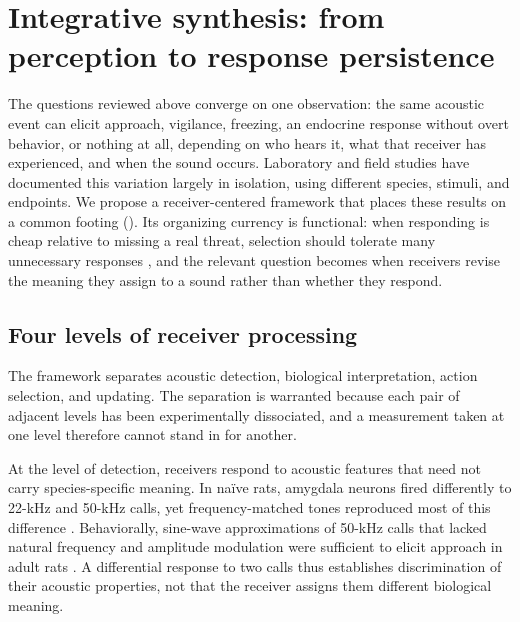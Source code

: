 \section{Integrative synthesis: from perception to response persistence}
\label{sec:synthesis}


The questions reviewed above converge on one observation: the same acoustic event can elicit approach, vigilance, freezing, an endocrine response without overt behavior, or nothing at all, depending on who hears it, what that receiver has experienced, and when the sound occurs. Laboratory and field studies have documented this variation largely in isolation, using different species, stimuli, and endpoints. We propose a receiver-centered framework that places these results on a common footing (). Its organizing currency is functional: when responding is cheap relative to missing a real threat, selection should tolerate many unnecessary responses \citep{Nesse2005}, and the relevant question becomes when receivers revise the meaning they assign to a sound rather than whether they respond.

\subsection{Four levels of receiver processing}
\label{sec:synthesis-levels}

The framework separates acoustic detection, biological interpretation, action selection, and updating. The separation is warranted because each pair of adjacent levels has been experimentally dissociated, and a measurement taken at one level therefore cannot stand in for another.

At the level of detection, receivers respond to acoustic features that need not carry species-specific meaning. In naïve rats, amygdala neurons fired differently to 22-kHz and 50-kHz calls, yet frequency-matched tones reproduced most of this difference \citep{ParsanaEtAl2012a}. Behaviorally, sine-wave approximations of 50-kHz calls that lacked natural frequency and amplitude modulation were sufficient to elicit approach in adult rats \citep{WohrSchwarting2007}. A differential response to two calls thus establishes discrimination of their acoustic properties, not that the receiver assigns them different biological meaning.

